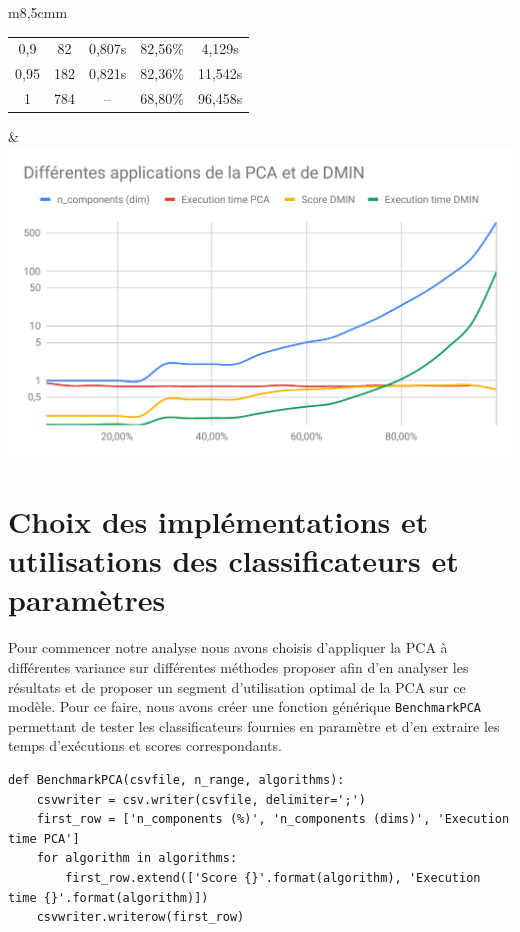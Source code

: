 \documentclass[12pt,a4paper]{article}
\begin{document}
{\begin{tabular}{m{}m{}}
\begin{tabular}{|c|c|c|c|c|}
        0,9          & 82             & 0,807s                   & 82,56\%          & 4,129s     \\
        0,95         & 182            & 0,821s                   & 82,36\%          & 11,542s    \\
        1            & 784            & --                       & 68,80\%          & 96,458s    \\
        \hline
    \end{tabular} & \includegraphics[scale=0.45]{PCA+DMIN.pdf} \\
\end{tabular}

\section{Choix des implémentations et utilisations des classificateurs et paramètres}



Pour commencer notre analyse nous avons choisis d'appliquer la PCA à différentes variance sur différentes méthodes proposer afin d'en analyser les résultats et de proposer un segment d'utilisation optimal de la PCA sur ce modèle. Pour ce faire, nous avons créer une fonction générique \lstinline[style=default]|BenchmarkPCA| permettant de tester les classificateurs fournies en paramètre et d'en extraire les temps d'exécutions et scores correspondants.
\begin{lstlisting}[style=darkula]
def BenchmarkPCA(csvfile, n_range, algorithms):
	csvwriter = csv.writer(csvfile, delimiter=';')
	first_row = ['n_components (%)', 'n_components (dims)', 'Execution time PCA']
	for algorithm in algorithms:
		first_row.extend(['Score {}'.format(algorithm), 'Execution time {}'.format(algorithm)])
	csvwriter.writerow(first_row)


\end{lstlisting}}
\end{document}
